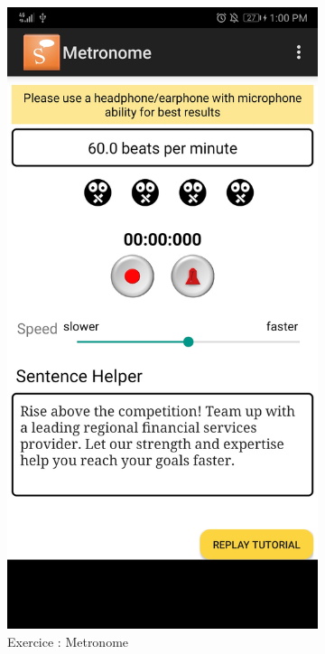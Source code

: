 \begin{appendices}
\begin{landscape}
\begin{figure}[h]
\begin{subfigure}{.25\textwidth}
    \includegraphics[width=.75\linewidth]{content/imgs/old_app_3.jpg}
    \caption{Exercice : Metronome}
  \end{subfigure}%
  \begin{subfigure}{.25\textwidth}
    \centering

\end{subfigure}
\end{figure}
\end{landscape}
\end{appendices}
